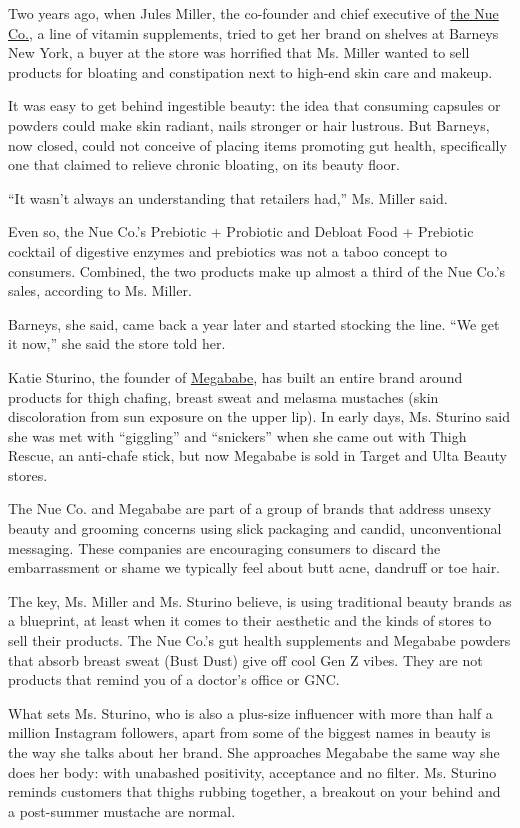 Two years ago, when Jules Miller, the co-founder and chief executive of
\href{https://www.thenueco.com/}{the Nue Co.}, a line of vitamin
supplements, tried to get her brand on shelves at Barneys New York, a
buyer at the store was horrified that Ms. Miller wanted to sell products
for bloating and constipation next to high-end skin care and makeup.

It was easy to get behind ingestible beauty: the idea that consuming
capsules or powders could make skin radiant, nails stronger or hair
lustrous. But Barneys, now closed, could not conceive of placing items
promoting gut health, specifically one that claimed to relieve chronic
bloating, on its beauty floor.

``It wasn't always an understanding that retailers had,'' Ms. Miller
said.

Even so, the Nue Co.'s Prebiotic + Probiotic and Debloat Food +
Prebiotic cocktail of digestive enzymes and prebiotics was not a taboo
concept to consumers. Combined, the two products make up almost a third
of the Nue Co.'s sales, according to Ms. Miller.

Barneys, she said, came back a year later and started stocking the line.
``We get it now,'' she said the store told her.

Katie Sturino, the founder of
\href{https://megababebeauty.com/}{Megababe}, has built an entire brand
around products for thigh chafing, breast sweat and melasma mustaches
(skin discoloration from sun exposure on the upper lip). In early days,
Ms. Sturino said she was met with ``giggling'' and ``snickers'' when she
came out with Thigh Rescue, an anti-chafe stick, but now Megababe is
sold in Target and Ulta Beauty stores.

The Nue Co. and Megababe are part of a group of brands that address
unsexy beauty and grooming concerns using slick packaging and candid,
unconventional messaging. These companies are encouraging consumers to
discard the embarrassment or shame we typically feel about butt acne,
dandruff or toe hair.

The key, Ms. Miller and Ms. Sturino believe, is using traditional beauty
brands as a blueprint, at least when it comes to their aesthetic and the
kinds of stores to sell their products. The Nue Co.'s gut health
supplements and Megababe powders that absorb breast sweat (Bust Dust)
give off cool Gen Z vibes. They are not products that remind you of a
doctor's office or GNC.

What sets Ms. Sturino, who is also a plus-size influencer with more than
half a million Instagram followers, apart from some of the biggest names
in beauty is the way she talks about her brand. She approaches Megababe
the same way she does her body: with unabashed positivity, acceptance
and no filter. Ms. Sturino reminds customers that thighs rubbing
together, a breakout on your behind and a post-summer mustache are
normal.

